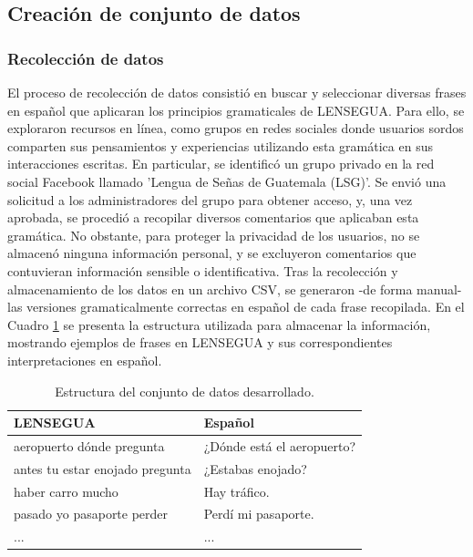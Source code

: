 \subsection{Creación de conjunto de datos}

\subsubsection{Recolección de datos}

El proceso de recolección de datos consistió en buscar y seleccionar diversas frases en español que aplicaran los principios gramaticales de LENSEGUA. Para ello, se exploraron recursos en línea, como grupos en redes sociales donde usuarios sordos comparten sus pensamientos y experiencias utilizando esta gramática en sus interacciones escritas. En particular, se identificó un grupo privado en la red social Facebook llamado 'Lengua de Señas de Guatemala (LSG)'. Se envió una solicitud a los administradores del grupo para obtener acceso, y, una vez aprobada, se procedió a recopilar diversos comentarios que aplicaban esta gramática. No obstante, para proteger la privacidad de los usuarios, no se almacenó ninguna información personal, y se excluyeron comentarios que contuvieran información sensible o identificativa. Tras la recolección y almacenamiento de los datos en un archivo CSV, se generaron -de forma manual- las versiones gramaticalmente correctas en español de cada frase recopilada. En el Cuadro \ref{tab:lensegua-espanol} se presenta la estructura utilizada para almacenar la información, mostrando ejemplos de frases en LENSEGUA y sus correspondientes interpretaciones en español.

\vspace{0.5cm}
\begin{table}[H]
    \centering
    \begin{tabular}{|l|l|}
        \hline
        \textbf{LENSEGUA} & \textbf{Español} \\
        \hline
        aeropuerto dónde pregunta & ¿Dónde está el aeropuerto? \\
        \hline
        antes tu estar enojado pregunta & ¿Estabas enojado? \\
        \hline
        haber carro mucho & Hay tráfico. \\
        \hline
        pasado yo pasaporte perder & Perdí mi pasaporte. \\
        \hline
        ... & ... \\
        \hline
    \end{tabular}
    \caption{Estructura del conjunto de datos desarrollado.}
    \label{tab:lensegua-espanol}
\end{table}

